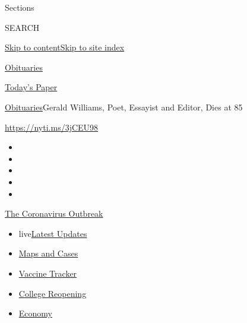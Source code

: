 Sections

SEARCH

\protect\hyperlink{site-content}{Skip to
content}\protect\hyperlink{site-index}{Skip to site index}

\href{https://www.nytimes.com/section/obituaries}{Obituaries}

\href{https://myaccount.nytimes.com/auth/login?response_type=cookie\&client_id=vi}{}

\href{https://www.nytimes.com/section/todayspaper}{Today's Paper}

\href{/section/obituaries}{Obituaries}\textbar{}Gerald Williams, Poet,
Essayist and Editor, Dies at 85

\url{https://nyti.ms/3jCEU98}

\begin{itemize}
\item
\item
\item
\item
\item
\end{itemize}

\href{https://www.nytimes.com/news-event/coronavirus?action=click\&pgtype=Article\&state=default\&region=TOP_BANNER\&context=storylines_menu}{The
Coronavirus Outbreak}

\begin{itemize}
\tightlist
\item
  live\href{https://www.nytimes.com/2020/08/03/world/coronavirus-covid-19.html?action=click\&pgtype=Article\&state=default\&region=TOP_BANNER\&context=storylines_menu}{Latest
  Updates}
\item
  \href{https://www.nytimes.com/interactive/2020/us/coronavirus-us-cases.html?action=click\&pgtype=Article\&state=default\&region=TOP_BANNER\&context=storylines_menu}{Maps
  and Cases}
\item
  \href{https://www.nytimes.com/interactive/2020/science/coronavirus-vaccine-tracker.html?action=click\&pgtype=Article\&state=default\&region=TOP_BANNER\&context=storylines_menu}{Vaccine
  Tracker}
\item
  \href{https://www.nytimes.com/2020/08/02/us/covid-college-reopening.html?action=click\&pgtype=Article\&state=default\&region=TOP_BANNER\&context=storylines_menu}{College
  Reopening}
\item
  \href{https://www.nytimes.com/live/2020/08/03/business/stock-market-today-coronavirus?action=click\&pgtype=Article\&state=default\&region=TOP_BANNER\&context=storylines_menu}{Economy}
\end{itemize}


